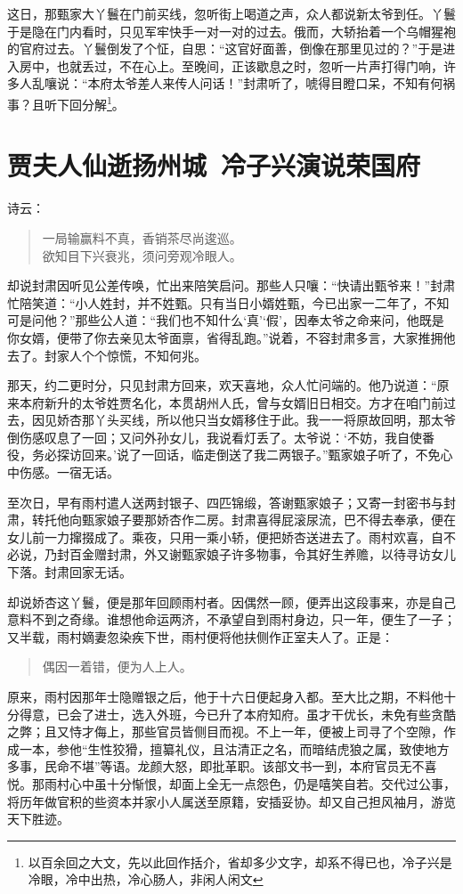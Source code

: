\documentclass[12pt,oneside]{book}
\newenvironment{shici}{%
\begin{verse}%
\centering\large\hspace{12pt}}%
{\end{verse}}
\begin{document}
这日，那甄家大丫鬟在门前买线，忽听街上喝道之声，众人都说新太爷到任。丫鬟于是隐在门内看时，只见军牢快手一对一对的过去。俄而，大轿抬着一个乌帽猩袍的官府过去。丫鬟倒发了个怔，自思：“这官好面善，倒像在那里见过的？”于是进入房中，也就丢过，不在心上。至晚间，正该歇息之时，忽听一片声打得门响，许多人乱嚷说：“本府太爷差人来传人问话！”封肃听了，唬得目瞪口呆，不知有何祸事？且听下回分解\footnote{以百余回之大文，先以此回作括介，省却多少文字，却系不得已也，冷子兴是冷眼，冷中出热，冷心肠人，非闲人闲文}。


\chapter{贾夫人仙逝扬州城~冷子兴演说荣国府}
诗云：

\begin{shici}
一局输赢料不真，香销茶尽尚逡巡。\\
欲知目下兴衰兆，须问旁观冷眼人。
\end{shici}


却说封肃因听见公差传唤，忙出来陪笑启问。那些人只嚷：“快请出甄爷来！”封肃忙陪笑道：“小人姓封，并不姓甄。只有当日小婿姓甄，今已出家一二年了，不知可是问他？”那些公人道：“我们也不知什么‘真’‘假’，因奉太爷之命来问，他既是你女婿，便带了你去亲见太爷面禀，省得乱跑。”说着，不容封肃多言，大家推拥他去了。封家人个个惊慌，不知何兆。

那天，约二更时分，只见封肃方回来，欢天喜地，众人忙问端的。他乃说道：“原来本府新升的太爷姓贾名化，本贯胡州人氏，曾与女婿旧日相交。方才在咱门前过去，因见娇杏那丫头买线，所以他只当女婿移住于此。我一一将原故回明，那太爷倒伤感叹息了一回；又问外孙女儿，我说看灯丢了。太爷说：‘不妨，我自使番役，务必探访回来。’说了一回话，临走倒送了我二两银子。”甄家娘子听了，不免心中伤感。一宿无话。

至次日，早有雨村遣人送两封银子、四匹锦缎，答谢甄家娘子；又寄一封密书与封肃，转托他向甄家娘子要那娇杏作二房。封肃喜得屁滚尿流，巴不得去奉承，便在女儿前一力撺掇成了。乘夜，只用一乘小轿，便把娇杏送进去了。雨村欢喜，自不必说，乃封百金赠封肃，外又谢甄家娘子许多物事，令其好生养赡，以待寻访女儿下落。封肃回家无话。

却说娇杏这丫鬟，便是那年回顾雨村者。因偶然一顾，便弄出这段事来，亦是自己意料不到之奇缘。谁想他命运两济，不承望自到雨村身边，只一年，便生了一子；又半载，雨村嫡妻忽染疾下世，雨村便将他扶侧作正室夫人了。正是：

\begin{shici}
偶因一着错，便为人上人。
\end{shici}


原来，雨村因那年士隐赠银之后，他于十六日便起身入都。至大比之期，不料他十分得意，已会了进士，选入外班，今已升了本府知府。虽才干优长，未免有些贪酷之弊；且又恃才侮上，那些官员皆侧目而视。不上一年，便被上司寻了个空隙，作成一本，参他“生性狡猾，擅纂礼仪，且沽清正之名，而暗结虎狼之属，致使地方多事，民命不堪”等语。龙颜大怒，即批革职。该部文书一到，本府官员无不喜悦。那雨村心中虽十分惭恨，却面上全无一点怨色，仍是嘻笑自若。交代过公事，将历年做官积的些资本并家小人属送至原籍，安插妥协。却又自己担风袖月，游览天下胜迹。
\end{document}
